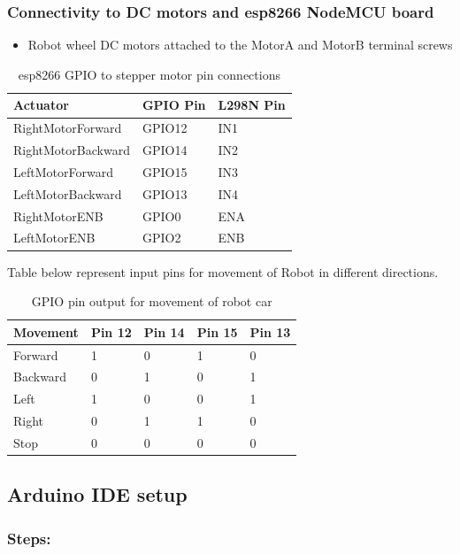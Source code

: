 \documentclass[sigconf]{acmart}
\begin{document}
\subsubsection{Connectivity to DC motors and esp8266 NodeMCU board}
\begin{itemize}
\item Robot wheel DC motors attached to the MotorA and MotorB terminal screws
\end{itemize}

\begin{table}[htb]
\caption{esp8266 GPIO to stepper motor pin connections}\label{T:pinlayout}
\begin{tabular}{lll}
Actuator & GPIO Pin & L298N Pin \\
\hline
    RightMotorForward & GPIO12 & IN1 \\
    RightMotorBackward & GPIO14 & IN2 \\
    LeftMotorForward & GPIO15 & IN3 \\
    LeftMotorBackward & GPIO13 & IN4 \\
    RightMotorENB & GPIO0 & ENA \\
    LeftMotorENB & GPIO2 & ENB \\
\end{tabular}
\end{table}

Table below represent input pins for movement of Robot in different directions.

\begin{table}[htb]
\caption{GPIO pin output for movement of robot car}
\begin{tabular}{lllll}
Movement & Pin 12 & Pin 14 & Pin 15 & Pin 13 \\
\hline
Forward & 1 & 0 & 1 & 0 \\ 
Backward & 0 & 1 & 0 & 1 \\
Left & 1 & 0 & 0 & 1 \\
Right & 0 & 1 & 1 & 0 \\
Stop  & 0 & 0 & 0 & 0 \\
\end{tabular}
\end{table}

\subsection{Arduino IDE setup}
\subsubsection{Steps:}
\end{document}
